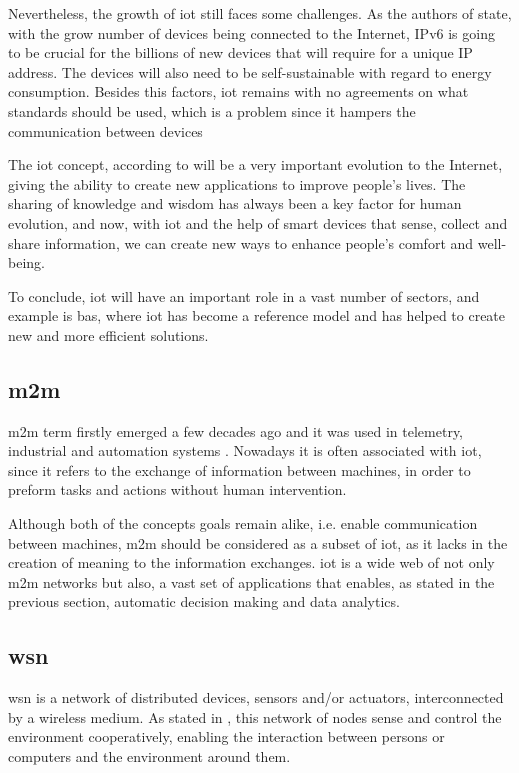 Nevertheless, the growth of \ac{iot} still faces some challenges. As the authors of \cite{Al-fuqaha2015} state, with the grow number of devices being connected to the Internet, IPv6 is going to be crucial for the billions of new devices that will require for a unique IP address. The devices will also need to be self-sustainable with regard to energy consumption. Besides this factors, \ac{iot} remains with no agreements on what standards should be used, which is a problem since it hampers the communication between devices


The \ac{iot} concept, according to \cite{Evans2011} will be a very important evolution to the Internet, giving the ability to create new applications to improve people's lives. The sharing of knowledge and wisdom has always been a key factor for human evolution, and now, with \ac{iot} and the help of smart devices that sense, collect and share information, we can create new ways to enhance people's comfort and well-being.

To conclude, \ac{iot} will have an important role in a vast number of sectors, and example is \ac{bas}, where \ac{iot} has become a reference model and has helped to create new and more efficient solutions.



\subsection{\acf{m2m}}

\acf{m2m} term firstly emerged a few decades ago and it was used in telemetry, industrial and automation systems \cite{}. Nowadays it is often associated with \ac{iot}, since it refers to the exchange of information between machines, in order to preform tasks and actions without human intervention.

Although both of the concepts goals remain alike, i.e. enable communication between machines, \ac{m2m} should be considered as a subset of \ac{iot}, as it lacks in the creation of meaning to the information exchanges. \ac{iot} is a wide web of not only \ac{m2m} networks but also, a vast set of applications that enables, as stated in the previous section, automatic decision making and data analytics. 

\subsection{\acf{wsn}}

\acf{wsn} is a network of distributed devices, sensors and/or actuators, interconnected by a wireless medium. As stated in \cite{IEC2014a}, this network of nodes sense and control the environment cooperatively, enabling the interaction between persons or computers and the environment around them. 

